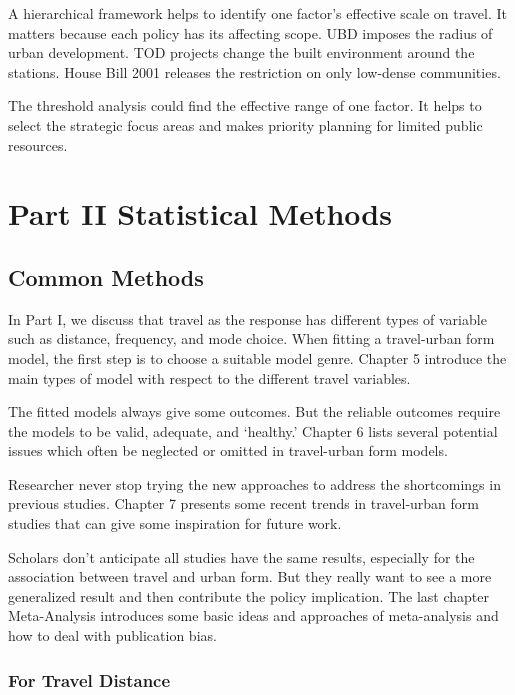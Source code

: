\documentclass[
  11pt,
  openany]{memoir}
\begin{document}
A hierarchical framework helps to identify one factor's effective scale on travel.
It matters because each policy has its affecting scope. UBD imposes the radius of urban development. TOD projects change the built environment around the stations. House Bill 2001 releases the restriction on only low-dense communities.

The threshold analysis could find the effective range of one factor. It helps to select the strategic focus areas and makes priority planning for limited public resources.

\hypertarget{part-part-ii-statistical-methods}{%
\part*{Part II Statistical Methods}\label{part-part-ii-statistical-methods}}

\hypertarget{common-methods}{%
\chapter{Common Methods}\label{common-methods}}

In Part I, we discuss that travel as the response has different types of variable such as distance, frequency, and mode choice. When fitting a travel-urban form model, the first step is to choose a suitable model genre.
Chapter 5 introduce the main types of model with respect to the different travel variables.

The fitted models always give some outcomes. But the reliable outcomes require the models to be valid, adequate, and `healthy.'
Chapter 6 lists several potential issues which often be neglected or omitted in travel-urban form models.

Researcher never stop trying the new approaches to address the shortcomings in previous studies.
Chapter 7 presents some recent trends in travel-urban form studies that can give some inspiration for future work.

Scholars don't anticipate all studies have the same results, especially for the association between travel and urban form.
But they really want to see a more generalized result and then contribute the policy implication.
The last chapter Meta-Analysis introduces some basic ideas and approaches of meta-analysis and how to deal with publication bias.

\hypertarget{for-travel-distance}{%
\section{For Travel Distance}\label{for-travel-distance}}
\end{document}
